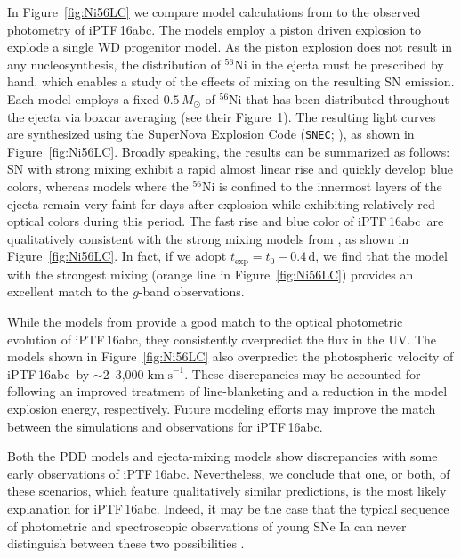 \documentclass[twocolumn]{aastex61}
\newcommand{\sm}{M_\odot}
\newcommand{\abc}{iPTF\,16abc}
\begin{document}
In Figure~\ref{fig:Ni56LC} we compare model calculations from \citet{2016ApJ...826...96P} to the observed photometry of \abc. The \citeauthor{2016ApJ...826...96P} models employ a piston driven explosion to explode a single WD progenitor model. As the piston explosion does not result in any nucleosynthesis, the distribution of $^{56}$Ni in the ejecta must be prescribed by hand, which enables a study of the effects of mixing on the resulting SN emission. Each model employs a fixed $0.5\,\sm$ of $^{56}$Ni that has been distributed throughout the ejecta via boxcar averaging (see their Figure~1). The resulting light curves are synthesized using the SuperNova Explosion Code (\texttt{SNEC}; \citealt{2015ApJ...814...63M}), as shown in Figure~\ref{fig:Ni56LC}. Broadly speaking, the results can be summarized as follows: SN with strong mixing exhibit a rapid almost linear rise and quickly develop blue colors, whereas models where the $^{56}$Ni is confined to the innermost layers of the ejecta remain very faint for days after explosion while exhibiting relatively red optical colors during this period. The fast rise and blue color of \abc\ are qualitatively consistent with the strong mixing models from \citet{2016ApJ...826...96P}, as shown in Figure~\ref{fig:Ni56LC}. In fact, if we adopt $t_\mathrm{exp} = t_0 - 0.4 \, \mathrm{d}$, we find that the model with the strongest mixing (orange line in Figure~\ref{fig:Ni56LC}) provides an excellent match to the $g$-band observations.

While the models from \citet{2016ApJ...826...96P} provide a good match to the optical photometric evolution of \abc, they consistently overpredict the flux in the UV. The models shown in Figure~\ref{fig:Ni56LC} also overpredict the photospheric velocity of \abc\ by $\sim$2--3,000$\; \mathrm{km \; s}^{-1}$. These discrepancies may be accounted for following an improved treatment of line-blanketing and a reduction in the model explosion energy, respectively. Future modeling efforts may improve the match between the simulations and observations for \abc.

Both the PDD models and ejecta-mixing models show discrepancies with some early observations of \abc. Nevertheless, we conclude that one, or both, of these scenarios, which feature qualitatively similar predictions, is the most likely explanation for \abc. Indeed, it may be the case that the typical sequence of photometric and spectroscopic observations of young SNe Ia can never distinguish between these two possibilities \citep{2017arXiv170603613N}.
\end{document}
